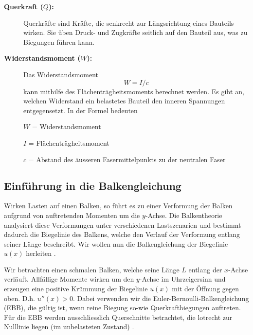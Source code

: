 \begin{description}
\item[\textbf{Querkraft ($Q$):}] Querkräfte sind Kräfte, die senkrecht zur Längsrichtung eines Bauteils wirken.
Sie üben Druck- und Zugkräfte seitlich auf den Bauteil aus, was zu Biegungen führen kann.

\item[\textbf{Widerstandsmoment ($W$):}] Das Widerstandsmoment
\begin{equation}
W=I/c
\end{equation}
kann mithilfe des Flächenträgheitsmoments berechnet werden.
Es gibt an, welchen Widerstand ein belastetes Bauteil den inneren Spannungen entgegensetzt. In der Formel bedeuten

$W$ = Widerstandsmoment

$I$ = Flächenträgheitsmoment

$c$ = Abstand des äusseren Fasermittelpunkts zu der neutralen Faser
\end{description}

\subsection{Einführung in die Balkengleichung}
Wirken Lasten auf einen Balken, so führt es zu einer Verformung der Balken aufgrund von auftretenden Momenten um die $y$-Achse.
Die Balkentheorie analysiert diese Verformungen unter verschiedenen Lastszenarien und bestimmt dadurch die Biegelinie des Balkens, welche den Verlauf der Verformung entlang seiner Länge beschreibt.
Wir wollen nun die Balkengleichung der Biegelinie $u(x)$ herleiten \cite{balken:Balkentheorie}.

Wir betrachten einen schmalen Balken, welche seine Länge $L$ entlang der $x$-Achse verläuft.
Allfällige Momente wirken um den $y$-Achse im Uhrzeigersinn und erzeugen eine positive Krümmung der Biegelinie $u(x)$ mit der Öffnung gegen oben.
D.h. $u''(x) > 0$.
Dabei verwenden wir die Euler-Bernoulli-Balkengleichung (EBB), die gültig ist, wenn reine Biegung so-wie Querkraftbiegungen auftreten.
Für die EBB werden ausschliesslich Querschnitte betrachtet, die lotrecht zur Nulllinie liegen (im unbelasteten Zustand) \cite{balken:Biegelinie}.